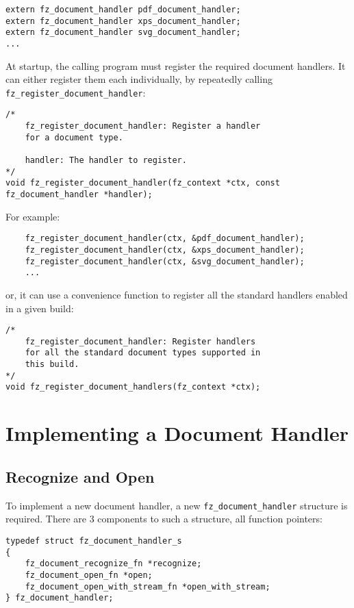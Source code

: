\documentclass[oneside]{book}
\begin{document}
\begin{lstlisting}
extern fz_document_handler pdf_document_handler;
extern fz_document_handler xps_document_handler;
extern fz_document_handler svg_document_handler;
...
\end{lstlisting}

At startup, the calling program must register the required document handlers. It can either register them each individually, by repeatedly calling \texttt{fz\_register\_document\_handler}:

\begin{lstlisting}
/*
	fz_register_document_handler: Register a handler
	for a document type.

	handler: The handler to register.
*/
void fz_register_document_handler(fz_context *ctx, const fz_document_handler *handler);
\end{lstlisting}

For example:

\begin{lstlisting}
	fz_register_document_handler(ctx, &pdf_document_handler);
	fz_register_document_handler(ctx, &xps_document_handler);
	fz_register_document_handler(ctx, &svg_document_handler);
	...
\end{lstlisting}

or, it can use a convenience function to register all the standard handlers enabled in a given build:

\begin{lstlisting}
/*
	fz_register_document_handler: Register handlers
	for all the standard document types supported in
	this build.
*/
void fz_register_document_handlers(fz_context *ctx);
\end{lstlisting}

\section{Implementing a Document Handler}

\subsection{Recognize and Open}

To implement a new document handler, a new \texttt{fz\_document\_handler} structure is required. There are 3 components to such a structure, all function pointers:

\begin{lstlisting}
typedef struct fz_document_handler_s
{
	fz_document_recognize_fn *recognize;
	fz_document_open_fn *open;
	fz_document_open_with_stream_fn *open_with_stream;
} fz_document_handler;
\end{lstlisting}
\end{document}

